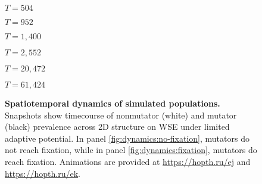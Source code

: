 \begin{figure}
{\begin{minipage}{\textwidth}
  \begin{minipage}[c]{0.154\textwidth}
\hfill
\begin{varwidth}{\textwidth}
$T = 504$
\end{varwidth}
\hfill
  \end{minipage}
  \begin{minipage}[c]{0.154\textwidth}
\hfill
\begin{varwidth}{\textwidth}
$T = 952$
\end{varwidth}
\hfill
  \end{minipage}
  \begin{minipage}[c]{0.154\textwidth}
\hfill
\begin{varwidth}{\textwidth}
$T = 1,400$
\end{varwidth}
\hfill
  \end{minipage}
  \begin{minipage}[c]{0.154\textwidth}
\hfill
\begin{varwidth}{\textwidth}
$T = 2,552$
\end{varwidth}
\hfill
  \end{minipage}
  \begin{minipage}[c]{0.154\textwidth}
\hfill
\begin{varwidth}{\textwidth}
$T = 20,472$
\end{varwidth}
\hfill
  \end{minipage}
  \begin{minipage}[c]{0.154\textwidth}
\hfill
\begin{varwidth}{\textwidth}
$T = 61,424$
\end{varwidth}
\hfill
  \end{minipage}

  \end{minipage}%
  }%

\vspace{-2ex}

  \caption{
  \textbf{Spatiotemporal dynamics of simulated populations.}
  \footnotesize
  Snapshots show timecourse of nonmutator (white) and mutator (black) prevalence across 2D structure on WSE under limited adaptive potential.
  In panel \ref{fig:dynamics:no-fixation}, mutators do not reach fixation, while in panel \ref{fig:dynamics:fixation}, mutators do reach fixation.
  Animations are provided at \url{https://hopth.ru/ej} and \url{https://hopth.ru/ek}.
  }
  \label{fig:dynamics}

\vspace{-3ex}

\end{figure}
